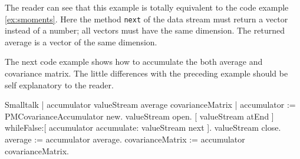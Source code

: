 The reader can see that this example is totally equivalent to the
code example \ref{ex:smoments}. Here the method \texttt{next} of the
data stream must return a vector instead of a number; all vectors
must have the same dimension. The returned average is a vector of
the same dimension.

The next code example shows how to accumulate the both average and
covariance matrix. The little differences with the preceding
example should be self explanatory to the reader.

\begin{listing}{Smalltalk}
  { }
 | accumulator valueStream average covarianceMatrix |
 accumulator := PMCovarianceAccumulator new.
 valueStream open.
 [ valueStream atEnd ]
        whileFalse:[ accumulator accumulate: valueStream next ].
 valueStream close.
 average := accumulator average.
 covarianceMatrix := accumulator covarianceMatrix.
\end{listing}


